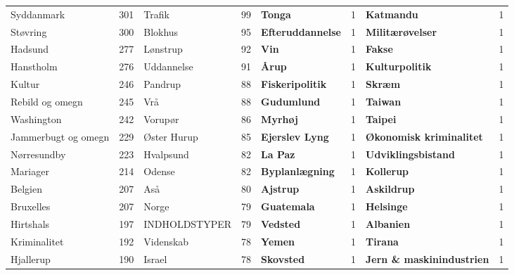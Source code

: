\begin{table*}[h]
\begin{tabular}{l|c|l|c|l|c|l|c}
		Syddanmark & 301 & Trafik & 99 & \textbf{Tonga} & 1 & \textbf{Katmandu} & 1 \\
		Støvring & 300 & Blokhus & 95 & \textbf{Efteruddannelse} & 1 & \textbf{Militærøvelser} & 1 \\
		Hadsund & 277 & Lønstrup & 92 & \textbf{Vin} & 1 & \textbf{Fakse} & 1 \\
		Hanstholm & 276 & Uddannelse & 91 & \textbf{Årup} & 1 & \textbf{Kulturpolitik} & 1 \\
		Kultur & 246 & Pandrup & 88 & \textbf{Fiskeripolitik} & 1 & \textbf{Skræm} & 1 \\
		Rebild og omegn & 245 & Vrå & 88 & \textbf{Gudumlund} & 1 & \textbf{Taiwan} & 1 \\
		Washington & 242 & Vorupør & 86 & \textbf{Myrhøj} & 1 & \textbf{Taipei} & 1 \\
		Jammerbugt og omegn & 229 & Øster Hurup & 85 & \textbf{Ejerslev Lyng} & 1 & \textbf{Økonomisk kriminalitet} & 1 \\
		Nørresundby & 223 & Hvalpsund & 82 & \textbf{La Paz} & 1 & \textbf{Udviklingsbistand} & 1 \\
		Mariager & 214 & Odense & 82 & \textbf{Byplanlægning} & 1 & \textbf{Kollerup} & 1 \\
		Belgien & 207 & Aså & 80 & \textbf{Ajstrup} & 1 & \textbf{Askildrup} & 1 \\
		Bruxelles & 207 & Norge & 79 & \textbf{Guatemala} & 1 & \textbf{Helsinge} & 1 \\
		Hirtshals & 197 & INDHOLDSTYPER & 79 & \textbf{Vedsted} & 1 & \textbf{Albanien} & 1 \\
		Kriminalitet & 192 & Videnskab & 78 & \textbf{Yemen} & 1 & \textbf{Tirana} & 1 \\
		Hjallerup & 190 & Israel & 78 & \textbf{Skovsted} & 1 & \textbf{Jern \& maskinindustrien} & 1 \\
		\bottomrule
	\end{tabular}
\end{table*}
